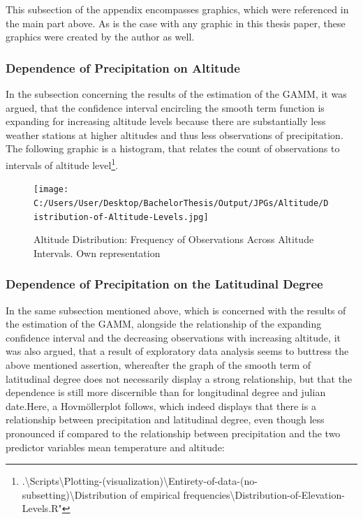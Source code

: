 \documentclass[
  12pt,
]{article}
\begin{document}
This subsection of the appendix encompasses graphics, which were
referenced in the main part above. As is the case with any graphic in
this thesis paper, these graphics were created by the author as well.

\clearpage

\hypertarget{dependence-of-precipitation-on-altitude}{%
\subsubsection{Dependence of Precipitation on
Altitude}\label{dependence-of-precipitation-on-altitude}}

In the subsection concerning the results of the estimation of the GAMM,
it was argued, that the confidence interval encircling the smooth term
function is expanding for increasing altitude levels because there are
substantially less weather stations at higher altitudes and thus less
observations of precipitation. The following graphic is a histogram,
that relates the count of observations to intervals of altitude
level\footnote{.\textbackslash Scripts\textbackslash Plotting-(visualization)\textbackslash Entirety-of-data-(no-subsetting)\textbackslash Distribution of empirical frequencies\textbackslash Distribution-of-Elevation-Levels.R"}.

\begin{figure}[h]
\texttt{[image: C:/Users/User/Desktop/BachelorThesis/Output/JPGs/Altitude/Distribution-of-Altitude-Levels.jpg]}
\caption{\label{histogram_altitude}Altitude Distribution: Frequency of Observations Across Altitude Intervals. Own representation}
\end{figure}

\clearpage

\hypertarget{dependence-of-precipitation-on-the-latitudinal-degree}{%
\subsubsection{Dependence of Precipitation on the Latitudinal
Degree}\label{dependence-of-precipitation-on-the-latitudinal-degree}}

In the same subsection mentioned above, which is concerned with the
results of the estimation of the GAMM, alongside the relationship of the
expanding confidence interval and the decreasing observations with
increasing altitude, it was also argued, that a result of exploratory
data analysis seems to buttress the above mentioned assertion,
whereafter the graph of the smooth term of latitudinal degree does not
necessarily display a strong relationship, but that the dependence is
still more discernible than for longitudinal degree and julian
date.\newline Here, a Hovmöllerplot follows, which indeed displays that
there is a relationship between precipitation and latitudinal degree,
even though less pronounced if compared to the relationship between
precipitation and the two predictor variables mean temperature and
altitude:
\end{document}
